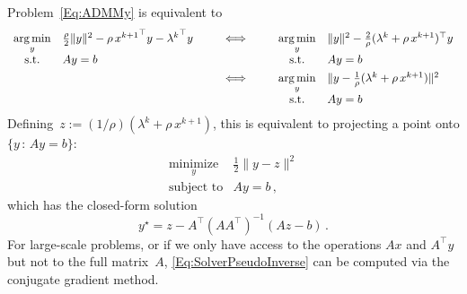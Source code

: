 \documentclass[letter,10pt]{article}
\theoremstyle{definition}
\theoremstyle{nonumberplain}
\newcommand{\mypar}[1]{\bigskip\noindent {\bf #1.}}
\begin{document}
	
	\mypar{Problem in \boldmath{$y$}}
	Problem~\eqref{Eq:ADMMy} is equivalent to
	\begin{align*}
			\begin{array}[t]{cl}
				\underset{y}{\arg\min} & \frac{\rho}{2} \|y\|^2 - \rho \,{x^{k+1}}^\top y - {\lambda^k}^\top y \\
				\text{s.t.} & Ay = b
			\end{array}
		\qquad
		&\Longleftrightarrow
		\qquad
			\begin{array}[t]{cl}
				\underset{y}{\arg\min} &  \|y\|^2 - \frac{2}{\rho} (\lambda^k + \rho\, x^{k+1})^\top y \\
				\text{s.t.} & Ay = b
			\end{array}
		\\
		&\Longleftrightarrow
		\qquad
			\begin{array}[t]{cl}
				\underset{y}{\arg\min} &  \|y - \frac{1}{\rho}(\lambda^k + \rho \, x^{k+1})\|^2 \\
				\text{s.t.} & Ay = b
			\end{array}
	\end{align*}
	Defining~$z:= (1/\rho)(\lambda^k + \rho\, x^{k+1})$, this is equivalent to projecting a point onto $\{y \,:\, Ay = b\}$:
	\begin{equation}\label{Eq:Nov20Miny}
		\begin{array}{ll}
			\underset{y}{\text{minimize}} & \frac{1}{2}\|y - z\|^2 \\
			\text{subject to} & Ay = b\,,
		\end{array}
	\end{equation}
	which has the closed-form solution
	\begin{equation}\label{Eq:SolverPseudoInverse}
		y^\star = z - A^\top (A A^\top)^{-1}(Az - b)\,.
	\end{equation}
	For large-scale problems, or if we only have access to the operations $Ax$ and $A^\top y$ but not to the full matrix~$A$, \eqref{Eq:SolverPseudoInverse} can be computed via the conjugate gradient method.
	
\end{document}
